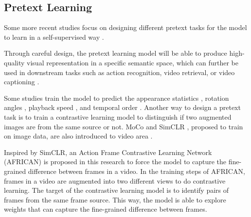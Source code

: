 \subsection{Pretext Learning}
Some more recent studies focus on designing different pretext tasks for the model to learn in a self-supervised way \parencite{wang2022internvideo}.

Through careful design, the pretext learning model will be able to produce high-quality visual representation in a specific semantic space, which can further be used in downstream tasks such as action recognition, video retrieval, or video captioning \parencite{10.1145/3577925}.

Some studies train the model to predict the appearance statistics \parencite{Wang_2019_CVPR}, rotation angles \parencite{DBLP:journals/corr/abs-1811-11387}, playback speed \parencite{Yao_2020_CVPR, 10.1007/978-3-030-58520-4_30}, and temporal order \parencite{10.1007/978-3-030-58604-1_26}. Another way to design a pretext task is to train a contrastive learning model to distinguish if two augmented images are from the same source or not. MoCo \parencite{finn2017model} and SimCLR \parencite{pmlr-v119-chen20j}, proposed to train on image data, are also introduced to video area \parencite{Feichtenhofer_2021_CVPR}.

Inspired by SimCLR, an Action Frame Contrastive Learning Network (AFRICAN) is proposed in this research to force the model to capture the fine-grained difference between frames in a video. In the training steps of AFRICAN, frames in a video are augmented into two different views to do contrastive learning. The target of the contrastive learning model is to identify pairs of frames from the same frame source. This way, the model is able to explore weights that can capture the fine-grained difference between frames. 

